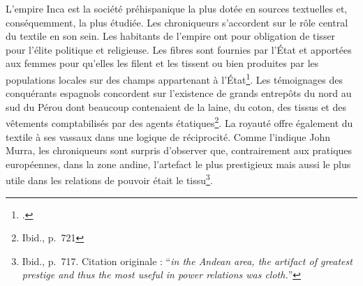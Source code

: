 L'empire Inca est la société préhispanique la plus dotée en sources textuelles et, conséquemment, la plus étudiée. Les chroniqueurs s'accordent sur le rôle central du textile en son sein. Les habitants de l'empire ont pour obligation de tisser pour l'élite politique et religieuse. Les fibres sont fournies par l'État et apportées aux femmes pour qu'elles les filent et les tissent ou bien produites par les populations locales sur des champs appartenant à l'État\footcite[p.~715-716]{murraClothItsFunctions1962}. Les témoignages des conquérants espagnols concordent sur l'existence de grands entrepôts du nord au sud du Pérou dont beaucoup contenaient de la laine, du coton, des tissus et des vêtements comptabilisés par des agents étatiques\footnote{Ibid., p.~721}. La royauté offre également du textile à ses vassaux dans une logique de réciprocité. Comme l'indique John Murra, les chroniqueurs sont surpris d'observer que, contrairement aux pratiques européennes, \og dans la zone andine, l'artefact le plus prestigieux mais aussi le plus utile dans les relations de pouvoir était le tissu\fg\footnote{Ibid., p.~717. Citation originale : \textquotedblleft \textit{in the Andean area, the artifact of greatest prestige and thus the most useful in power relations was cloth.}\textquotedblright}. 


